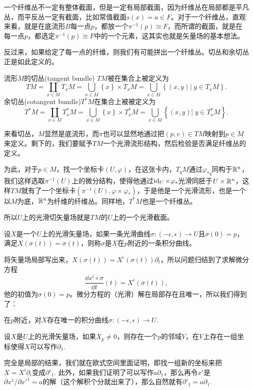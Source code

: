 一个纤维丛不一定有整体截面，但是一定有局部截面，因为纤维丛在局部都是平凡丛，而平反丛一定有截面，比如常值截面$s(x)=a\in F$。对于一个纤维丛，直观来看，就是在底流形$B$每一点$p$，都放一个$\pi^{-1}(p)\cong F$，而所谓的截面，就是在每一点$p$，都选定$\pi^{-1}(p)\cong F$中的一个元素，这其实也就是矢量场的基本想法。

\para 反过来，如果给定了每一点的纤维，则我们有可能拼出一个纤维丛。切丛和余切丛正是如此定义的。

\para 流形$M$的切丛(tangent bundle) $TM$被在集合上被定义为
\[
	TM=\coprod_{x\in M}T_xM=\bigcup_{x\in M} \left\{x\right\}\times T_xM=\bigcup_{x\in M} \left\{(x, y)\vert\; y\in T_xM\right\}.
\]
余切丛(cotangent bundle)$T^*M$在集合上被被定义为
\[
	T^*M=\coprod_{x\in M}T^*_xM=\bigcup_{x\in M} \left\{x\right\}\times T^*_xM=\bigcup_{x\in M} \left\{(x, y)\vert\; y\in T_x^*M\right\}.
\]

\para 来看切丛，$M$显然是底流形，而$\pi$也可以显然地通过把$(p,v)\in TM$映射到$p\in M$来定义。剩下的，我们要赋予$TM$一个光滑流形结构，然后检验是否满足纤维丛的定义。

为此，对于$p\in M$，找一个坐标卡$(U,\varphi)$，在这张卡内，$T_qM$通过$\varphi_{*q}$同构于$\mathbb{R}^n$，我们这样选取$\pi^{-1}(U)$上的微分结构，使得他通过$\operatorname{id}_U\times \varphi_*$光滑同胚于$U \times \mathbb{R}^n$，这样$TM$就有了一个坐标卡$(\pi^{-1}(U),\varphi\times \varphi_*)$，于是他是一个光滑流形，也是一个以$M$为底，$\mathbb{R}^n$为纤维的纤维丛。同样地，$T^*M$也是一个纤维丛。

\para 所以$U$上的光滑切矢量场就是$TM$的$U$上的一个光滑截面。

\para 设$X$是一个$U$上的光滑矢量场，如果一条光滑曲线$\sigma:(-\epsilon,\epsilon)\to U$且$\sigma(0)=p$，满足$X(\sigma(t))=\dot{\sigma}(t)$，则称$\sigma$是$X$在$p$附近的一条积分曲线。

将矢量场局部写出来，$X(\sigma(t))=X^i(\sigma(t))\partial_t$，所以问题归结到了求解微分方程
\[
	\frac{\dd x^i\circ \sigma}{\dd t}(t)=X^i(\sigma(t)),
\]
他的初值为$\sigma(0)=p$。微分方程的（光滑）解在局部存在且唯一，所以我们得到了：

\para 在$p$附近，对$X$存在唯一的积分曲线$\sigma:(-\epsilon,\epsilon)\to U$.

\lem 设$X$是$U$上的光滑矢量场，如果$X_p\neq 0$，则存在一个$p$的邻域$V$，在$V$上存在一组坐标使得$X$可以写作$\partial_1$.

\proof
	完全是局部的结果，我们就在欧式空间里面证明，即找一组新的坐标来把$X=X^i\partial_i$变成$\partial'_1$. 此外，如果我们证明了可以写作$a \partial_1$，那么再令$x'$是$\partial x^1/\partial x'^1=a$的解（这个解积个分就出来了），那么自然就有$\partial'_1=a\partial_1$.

